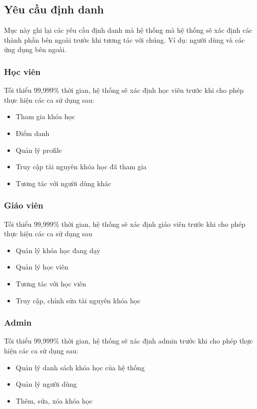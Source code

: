 \documentclass[./../main_file.tex]{subfiles}
\begin{document}
	
	\subsection{Yêu cầu định danh}
	Mục này ghi lại các yêu cầu định danh mà hệ thống mà hệ thống sẽ xác định các thành phần bên ngoài trước khi tương tác với chúng. Ví dụ: người dùng và các ứng dụng bên ngoài.
	
	\subsubsection{Học viên}
		Tối thiểu 99,999\% thời gian, hệ thống sẽ xác định học viên trước khi cho phép thực hiện các ca sử dụng sau:
		
		\begin{itemize}
			\item Tham gia khóa học
			\item Điểm danh
			\item Quản lý profile
			\item Truy cập tài nguyên khóa học đã tham gia
			\item Tương tác với người dùng khác
			
		\end{itemize}
	
	\subsubsection{Giáo viên}
		Tối thiểu 99,999\% thời gian, hệ thống sẽ xác định giáo viên trước khi cho phép thực hiện các ca sử dụng sau
		\begin{itemize}
			\item Quản lý khóa học đang dạy
			\item Quản lý học viên
			\item Tương tác với học viên
			\item Truy cập, chỉnh sửa tài nguyên khóa học
			
		\end{itemize}
	
	\subsubsection{Admin}
		Tối thiểu 99,999\% thời gian, hệ thống sẽ xác định admin trước khi cho phép thực hiện các ca sử dụng sau:
		
		\begin{itemize}
			\item Quản lý danh sách khóa học của hệ thống
			\item Quản lý người dùng
			\item Thêm, sửa, xóa khóa học
		\end{itemize}
	
\end{document}

